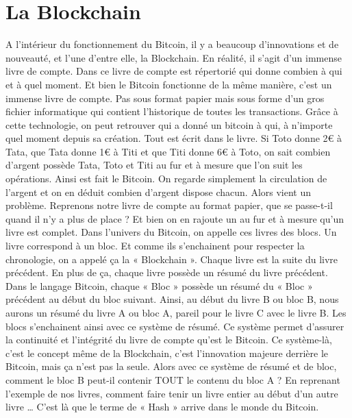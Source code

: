 \documentclass{bredele} %
\begin{document}
    \section*{La Blockchain}
    A l’intérieur du fonctionnement du Bitcoin, il y a beaucoup d’innovations et de nouveauté, et l’une d’entre elle, la Blockchain.
    En réalité, il s’agit d’un immense livre de compte. Dans ce livre de compte est répertorié qui donne combien à qui et à quel moment. Et bien le Bitcoin fonctionne de la même manière, c’est un immense livre de compte. Pas sous format papier mais sous forme d’un gros fichier informatique qui contient l’historique de toutes les transactions.
    \newline
    Grâce à cette technologie, on peut retrouver qui a donné un bitcoin à qui, à n’importe quel moment depuis sa création.
    \newline
    \newline
    Tout est écrit dans le livre. Si Toto donne 2€ à Tata, que Tata donne 1€ à Titi et que Titi donne 6€ à Toto, on sait combien d’argent possède Tata, Toto et Titi au fur et à mesure que l’on suit les opérations. Ainsi est fait le Bitcoin.
    \newline
    On regarde simplement la circulation de l’argent et on en déduit combien d’argent dispose chacun.
    \newline
    Alors vient un problème. Reprenons notre livre de compte au format papier, que se passe-t-il quand il n’y a plus de place ? Et bien on en rajoute un au fur et à mesure qu’un livre est complet.
    \newline
    Dans l’univers du Bitcoin, on appelle ces livres des blocs. Un livre correspond à un bloc. Et comme ils s’enchainent pour respecter la chronologie, on a appelé ça la « Blockchain ». Chaque livre est la suite du livre précédent.
    \newline
    En plus de ça, chaque livre possède un résumé du livre précédent. Dans le langage Bitcoin, chaque « Bloc » possède un résumé du « Bloc » précédent au début du bloc suivant.
    \newline
    Ainsi, au début du livre B ou bloc B, nous aurons un résumé du livre A ou bloc A, pareil pour le livre C avec le livre B.
    \newline
    Les blocs s’enchainent ainsi avec ce système de résumé. Ce système permet d’assurer la continuité et l’intégrité du livre de compte qu’est le Bitcoin.
    \newline
    Ce système-là, c’est le concept même de la Blockchain, c’est l’innovation majeure derrière le Bitcoin, mais ça n’est pas la seule.
    \newline
    Alors avec ce système de résumé et de bloc, comment le bloc B peut-il contenir TOUT le contenu du bloc A ? En reprenant l’exemple de nos livres, comment faire tenir un livre entier au début d’un autre livre …
    \newline
    \newline
    C’est là que le terme de « Hash » arrive dans le monde du Bitcoin.
\end{document}
